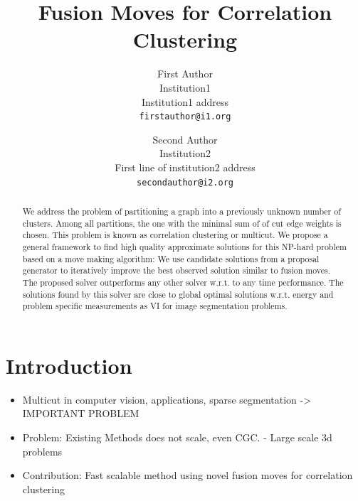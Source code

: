 \documentclass[10pt,twocolumn,letterpaper]{article}
\begin{document}

\title{Fusion Moves for Correlation Clustering}

\author{First Author\\
Institution1\\
Institution1 address\\
{\tt\small firstauthor@i1.org}
\and
Second Author\\
Institution2\\
First line of institution2 address\\
{\tt\small secondauthor@i2.org}
}

\maketitle


\listoftodos[Notes]
\begin{abstract}
   We address the problem of partitioning a  graph
   into a previously unknown number of clusters.
   Among all partitions, the one with the minimal 
   sum of of cut edge weights is chosen. 
   This problem is known as correlation clustering 
   or multicut.
   We propose a general framework to find
   high quality approximate solutions for 
   this NP-hard problem based on a move making algorithm:
   We use candidate solutions from a proposal generator
   to iteratively improve the best observed solution similar
   to fusion moves.
   The proposed solver outperforms any other solver
   w.r.t. to any time performance.
   The solutions found by this solver are close
   to global optimal solutions w.r.t. energy
   and problem specific measurements as VI for
   image segmentation problems.

\end{abstract}
\section{Introduction}

\begin{itemize}
  \item Multicut in computer vision, applications, sparse segmentation -> IMPORTANT PROBLEM
  \item Problem: Existing Methods does not scale, even CGC. - Large scale 3d problems
  \item Contribution: Fast scalable method using novel fusion moves for correlation clustering
\end{itemize}
\end{document}
